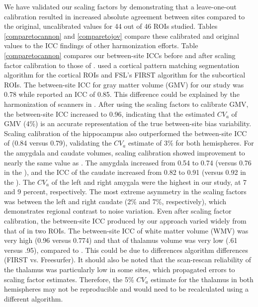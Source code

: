 \documentclass{article}
\begin{document}
We have validated our scaling factors by demonstrating that a leave-one-out calibration resulted in increased absolute agreement between sites compared to the original, uncalibrated values for 44 out of 46 ROIs studied. Tables \ref{comparetocannon} and \ref{comparetojov} compare these calibrated and original values to the ICC findings of other harmonization efforts. Table \ref{comparetocannon} compares our between-site ICCs before and after scaling factor calibration to those of \cite{cannon2014}. \cite{cannon2014} used a cortical pattern matching segmentation algorithm \cite{thompson2001detecting} for the cortical ROIs and FSL's FIRST algorithm for the subcortical ROIs. The between-site ICC for gray matter volume (GMV) for our study was 0.78 while \cite{cannon2014} reported an ICC of 0.85. This difference could be explained by the harmonization of scanners in \cite{cannon2014}. After using the scaling factors to calibrate GMV, the between-site ICC increased to 0.96, indicating that the estimated $CV_a$ of GMV (4\%) is an accurate representation of the true between-site bias variability. Scaling calibration of the hippocampus also outperformed the between-site ICC of \cite{cannon2014} (0.84 versus 0.79), validating the $CV_a$ estimate of 3\% for both hemispheres. For the amygdala and caudate volumes, scaling calibration showed improvement to nearly the same value as \cite{cannon2014}. The amygdala increased from 0.54 to 0.74 (versus 0.76 in the \cite{cannon2014}), and the ICC of the caudate increased from 0.82 to 0.91 (versus 0.92 in the \cite{cannon2014}). The $CV_a$ of the left and right amygala were the highest in our study, at 7 and 9 percent, respectively. The most extreme asymmetry in the scaling factors was between the left and right caudate (2\% and 7\%, respectively), which demonstrates regional contrast to noise variation. Even after scaling factor calibration, the between-site ICC produced by our approach varied widely from that of \cite{cannon2014} in two ROIs. The between-site ICC of white matter volume (WMV) was very high (0.96 versus 0.774) and that of thalamus volume was very low (.61 versus .95), compared to \cite{cannon2014}. This could be due to differences algorithm differences (FIRST vs. Freesurfer). It should also be noted that the scan-rescan reliability of the thalamus was particularly low in some sites, which propagated errors to scaling factor estimates. Therefore, the 5\% $CV_a$ estimate for the thalamus in both hemispheres may not be reproducible and would need to be recalculated using a different algorithm. 
\end{document}
